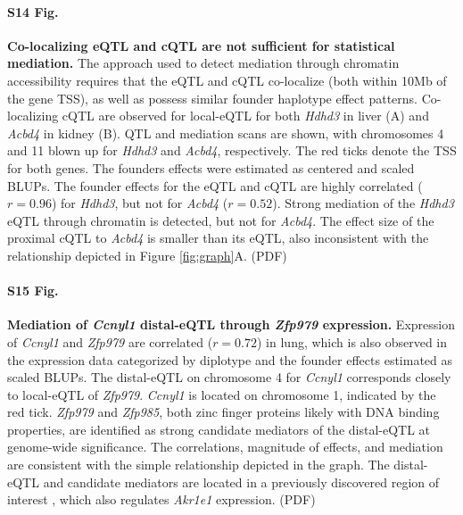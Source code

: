 \documentclass[10pt,letterpaper]{article}
\begin{document}
\paragraph*{S14 Fig.}
\label{S_colocalization}
{\bf Co-localizing eQTL and cQTL are not sufficient for statistical mediation.}
The approach used to detect mediation through chromatin accessibility requires that the eQTL and cQTL co-localize (both within 10Mb of the gene TSS), as well as possess similar founder haplotype effect patterns. Co-localizing cQTL are observed for local-eQTL for both \textit{Hdhd3} in liver (A) and \textit{Acbd4} in kidney (B). QTL and mediation scans are shown, with chromosomes 4 and 11 blown up for \textit{Hdhd3} and \textit{Acbd4}, respectively. The red ticks denote the TSS for both genes. The founders effects were estimated as centered and scaled BLUPs. The founder effects for the eQTL and cQTL are highly correlated ($r = 0.96$) for \textit{Hdhd3}, but not for \textit{Acbd4} ($r = 0.52$). Strong mediation of the \textit{Hdhd3} eQTL through chromatin is detected, but not for \textit{Acbd4}. The effect size of the proximal cQTL to \textit{Acbd4} is smaller than its eQTL, also inconsistent with the relationship depicted in Figure \ref{fig:graph}A. (PDF)

\paragraph*{S15 Fig.}
\label{S_ccnyl1_exmediation}
{\bf Mediation of \textit{Ccnyl1} distal-eQTL through \textit{Zfp979} expression.}
Expression of \textit{Ccnyl1} and \textit{Zfp979} are correlated ($r = 0.72$) in lung, which is also observed in the expression data categorized by diplotype and the founder effects estimated as scaled BLUPs. The distal-eQTL on chromosome 4 for \textit{Ccnyl1} corresponds closely to local-eQTL of \textit{Zfp979}. \textit{Ccnyl1} is located on chromosome 1, indicated by the red tick. \textit{Zfp979} and \textit{Zfp985}, both zinc finger proteins likely with DNA binding properties, are identified as strong candidate mediators of the distal-eQTL at genome-wide significance. The correlations, magnitude of effects, and mediation are consistent with the simple relationship depicted in the graph. The distal-eQTL and candidate mediators are located in a previously discovered region of interest \cite{HamiltonWilliams2013}, which also regulates \textit{Akr1e1} expression. (PDF)
\end{document}
